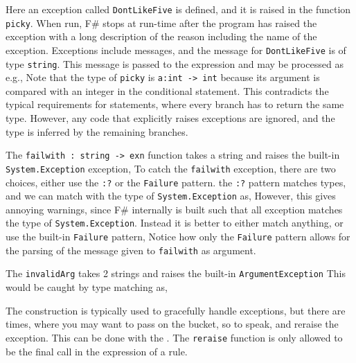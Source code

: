 %
%
Here an exception called \lstinline!DontLikeFive! is defined, and it is raised in the function \lstinline!picky!. When run, F\# stops at run-time after the program has raised the exception with a long description of the reason including the name of the exception. Exceptions include messages, and the message for \lstinline!DontLikeFive! is of type \lstinline!string!. This message is passed to the  expression and may be processed as e.g., 
%
%
Note that the type of \lstinline!picky! is \lstinline!a:int -> int! because its argument is compared with an integer in the conditional statement. This contradicts the typical requirements for  statements, where every branch has to return the same type. However, any code that explicitly raises exceptions are ignored, and the type is inferred by the remaining branches.

The \lstinline!failwith : string -> exn! function takes a string and raises the built-in \lstinline!System.Exception! exception, 
%
%
To catch the \lstinline!failwith! exception, there are two choices, either use the \lstinline!:?! or the \lstinline!Failure! pattern. the \lstinline!:?! pattern matches types, and we can match with the type of \lstinline!System.Exception! as,
%
%
However, this gives annoying warnings, since F\# internally is built such that all exception matches the type of \lstinline!System.Exception!. Instead it is better to either match anything,
%
%
or use the built-in \lstinline!Failure! pattern,
%
%
Notice how only the \lstinline!Failure! pattern allows for the parsing of the message given to \lstinline!failwith! as argument.

The \lstinline!invalidArg! takes 2 strings and raises the built-in \lstinline!ArgumentException!
%
%
This would be caught by type matching as,
%
%

The  construction is typically used to gracefully handle exceptions, but there are times, where you may want to pass on the bucket, so to speak, and reraise the exception. This can be done with the .
%
%
The \lstinline!reraise! function is only allowed to be the final call in the expression of a  rule.

